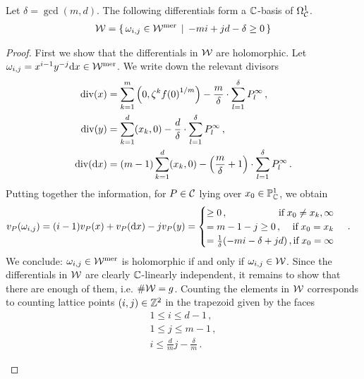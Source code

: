 \documentclass[main.tex]{subfiles}
\begin{document}
     \begin{prop}\label{prop:holom_diff}
	Let $\delta = \gcd(m,d)$. The following differentials form  a $\mathbb{C}$-basis of $\Omega^1_{\mathcal{C}}$.
	\begin{align}\label{eq:holm_diff}
	  \mathcal{W} =  \left\{ \, \omega_{i,j} \in \mathcal{W}^{\text{mer}} \, \mid \, -mi + jd - \delta \ge 0 \, \right\}
	\end{align}
     \end{prop}
     \begin{proof}
      First we show that the differentials in $\mathcal{W}$ are holomorphic.
      Let $\omega_{i,j} = x^{i-1}y^{-j} \mathrm d x \in \mathcal{W}^{\text{mer}}$. We write down the relevant divisors
      \begin{align*}
       \operatorname{div}(x) & = \sum_{k=1}^m \left(0,\zeta^k{f(0)}^{1/m}\right) - \frac{m}{\delta} \cdot \sum_{l = 1}^{\delta} P^{\infty}_l\,, \\
       \operatorname{div}(y) & = \sum_{k = 1}^d (x_k,0) - \frac{d}{\delta} \cdot \sum_{l = 1}^{\delta}  P^{\infty}_l\,, \\
       \operatorname{div}(\mathrm d x) & = (m-1)\sum_{k = 1}^d (x_k,0) - \left(\frac{m}{\delta} + 1\right)\cdot \sum_{l = 1}^{\delta}  P^{\infty}_l\,.
      \end{align*}
     Putting together the information, for $P \in \mathcal{C}$ lying over $x_0 \in \mathbb{P}^1_{\mathbb{C}}$, we obtain
     \begin{align}\label{eq:diff_cases}
      v_P(\omega_{i,j}) & = (i-1) v_P(x) + v_P(\dx)  - j v_P(y) = 
	\begin{cases}
	 \ge 0\,, \hfill \text{if} \; x_0 \ne x_k,\infty \\
	 = m-1-j \ge 0 \,, \hfill \text{if} \; x_0 = x_k \\
	 = \frac{1}{\delta}(-mi-\delta+jd)\,,\hfill \text{if} \; x_0 = \infty
	\end{cases}\,.
     \end{align}
     We conclude: $\omega_{i,j} \in \mathcal{W}^{\text{mer}}$ is holomorphic if and only if $\omega_{i,j} \in \mathcal{W}$. \abstand
     Since the differentials in $\mathcal{W}$ are clearly $\mathbb{C}$-linearly independent, it remains to show that
     there are enough of them, i.e. $\#\mathcal{W} = g$. \abstand
     Counting the elements in $\mathcal{W}$ corresponds to counting lattice points $(i,j) \in \mathbb{Z}^2$ in the trapezoid given by the faces
     \begin{align*}
	1 \le i \le d-1\,,\\
	1 \le j \le m-1\,, \\
	i \le \frac{d}{m}j - \frac{\delta}{m}\,.
     \end{align*}
      \begin{figure}[H]

\end{figure}
\end{proof}
\end{document}

